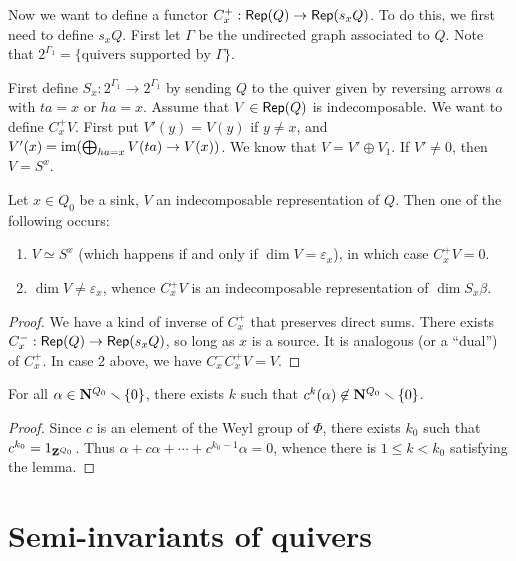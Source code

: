 \documentclass{article}
\begin{document}
Now we want to define a functor $C_x^+:\operatorname{\mathsf{Rep}}(Q) \to \operatorname{\mathsf{Rep}}(s_x Q)$. 
To do this, we first need to define $s_x Q$. First let $\Gamma$ be the undirected 
graph associated to $Q$. Note that 
$2^{\Gamma_1}=\{\text{quivers supported by }\Gamma\}$. 

First define \(S_x:2^{\Gamma_1} \to 2^{\Gamma_1}\) by sending \(Q\) to the quiver 
given by reversing arrows \(a\) with \(t a=x\) or \(h a=x\). 
Assume that \(V\in \operatorname{\mathsf{Rep}}(Q)\) is indecomposable. We want to define 
\(C_x^+ V\). First put \(V'(y)=V(y)\) if \(y\ne x\), and 
\(V'(x) = \operatorname{im}(\bigoplus_{h a=x} V(t a) \to V(x))\). We know that 
\(V=V'\oplus V_1\). If \(V'\ne 0\), then \(V=S^x\). 

\begin{theorem}
Let \(x\in Q_0\) be a sink, \(V\) an indecomposable representation of \(Q\). 
Then one of the following occurs:
\begin{enumerate}
  \item \(V\simeq S^x\) (which happens if and only if \(\dim V=\varepsilon_x\)), in which 
    case \(C_x^+ V=0\). 
  \item \(\dim V\ne \varepsilon_x\), whence \(C_x^+ V\) is an indecomposable 
    representation of \(\dim S_x\beta\). 
\end{enumerate}
\end{theorem}
\begin{proof}
We have a kind of inverse of \(C_x^+\) that preserves direct sums. There exists 
\(C_x^-:\operatorname{\mathsf{Rep}}(Q) \to \operatorname{\mathsf{Rep}}(s_xQ)\), so long as \(x\) is a 
source. It is analogous (or a ``dual'') of \(C_x^+\). In case 2 above, we have 
\(C_x^- C_x^+ V = V\). 
\end{proof}

\begin{lemma}\label{lem:tech-dynkin}
For all \(\alpha\in \mathbf{N}^{Q_0}\smallsetminus \{0\}\), there exists $k$ such that 
\(c^k(\alpha)\not\in \mathbf{N}^{Q_0}\smallsetminus \{0\}\). 
\end{lemma}
\begin{proof}
Since \(c\) is an element of the Weyl group of \(\Phi\), there exists 
\(k_0\) such that \(c^{k_0} = 1_{\mathbf{Z}^{Q_0}}\). 
Thus \(\alpha+c \alpha+ \cdots + c^{k_0-1}\alpha = 0 \), whence there is 
\(1\leqslant k<k_0\) satisfying the lemma. 
\end{proof}





\section{Semi-invariants of quivers}
\end{document}
